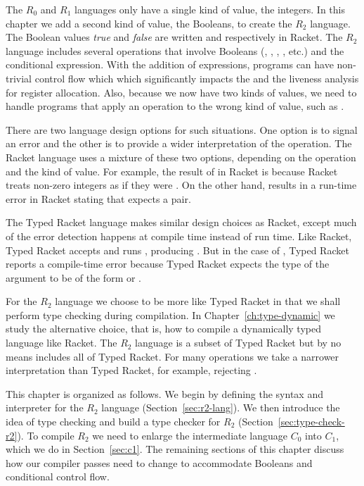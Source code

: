 \documentclass[11pt]{book}
\begin{document}
The $R_0$ and $R_1$ languages only have a single kind of value, the
integers. In this chapter we add a second kind of value, the Booleans,
to create the $R_2$ language. The Boolean values \emph{true} and
\emph{false} are written  and  respectively in
Racket.  The $R_2$ language includes several operations that involve
Booleans (, , , \key{<}, etc.) and the
conditional  expression. With the addition of 
expressions, programs can have non-trivial control flow which which
significantly impacts the  and the liveness
analysis for register allocation. Also, because we now have two kinds
of values, we need to handle programs that apply an operation to the
wrong kind of value, such as .

There are two language design options for such situations.  One option
is to signal an error and the other is to provide a wider
interpretation of the operation. The Racket language uses a mixture of
these two options, depending on the operation and the kind of
value. For example, the result of  in Racket is
 because Racket treats non-zero integers as if they were
. On the other hand,  results in a run-time
error in Racket stating that  expects a pair.

The Typed Racket language makes similar design choices as Racket,
except much of the error detection happens at compile time instead of
run time. Like Racket, Typed Racket accepts and runs ,
producing . But in the case of , Typed Racket
reports a compile-time error because Typed Racket expects the type of
the argument to be of the form  or .

For the $R_2$ language we choose to be more like Typed Racket in that
we shall perform type checking during compilation. In
Chapter~\ref{ch:type-dynamic} we study the alternative choice, that
is, how to compile a dynamically typed language like Racket.  The
$R_2$ language is a subset of Typed Racket but by no means includes
all of Typed Racket. For many operations we take a narrower
interpretation than Typed Racket, for example, rejecting .

This chapter is organized as follows.  We begin by defining the syntax
and interpreter for the $R_2$ language (Section~\ref{sec:r2-lang}). We
then introduce the idea of type checking and build a type checker for
$R_2$ (Section~\ref{sec:type-check-r2}). To compile $R_2$ we need to
enlarge the intermediate language $C_0$ into $C_1$, which we do in
Section~\ref{sec:c1}. The remaining sections of this chapter discuss
how our compiler passes need to change to accommodate Booleans and
conditional control flow.
\end{document}
